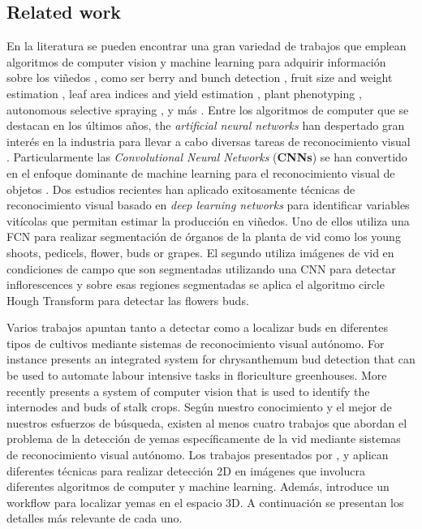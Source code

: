 \documentclass[a4paper,authoryear,review]{elsarticle}
\begin{document}
\subsection{Related work}   \label{sec:related}

En la literatura se pueden encontrar una gran variedad de trabajos que emplean algoritmos de computer vision y machine learning para adquirir información sobre los viñedos \citep{seng2018computer}, como ser berry and bunch detection \citep{nuske2011yield}, fruit size and weight estimation \citep{tardaguila2012automatic}, leaf area indices and yield estimation \citep{diago2012grapevine}, plant phenotyping \citep{herzog2014objective, herzog2014initial}, autonomous selective spraying \citep{berenstein2010grape}, y más \citep{tardaguila2012applications, whalley2013applications}. Entre los algoritmos de computer que se destacan en los últimos años, the \emph{artificial neural networks} han despertado gran interés en la industria para llevar a cabo diversas tareas de reconocimiento visual \citep{hirano2006industry, kahng2017cti, tilgner2019multi}. Particularmente las \emph{Convolutional Neural Networks} (\textbf{CNNs}) se han convertido en el enfoque dominante de machine learning para el reconocimiento visual de objetos \citep{ning2017inception}. Dos estudios recientes han aplicado exitosamente técnicas de reconocimiento visual basado en \emph{deep learning networks} para identificar variables vitícolas que permitan estimar la producción en viñedos. Uno de ellos \citet{grimm2019adaptable} utiliza una FCN para realizar segmentación de órganos de la planta de vid como los young shoots, pedicels, flower, buds or grapes. El segundo \citet{rudolph2018efficient} utiliza imágenes de vid en condiciones de campo que son segmentadas utilizando una CNN para detectar inflorescences y sobre esas regiones segmentadas se aplica el algoritmo circle Hough Transform para detectar las flowers buds.

Varios trabajos apuntan tanto a detectar como a localizar buds en diferentes tipos de cultivos mediante sistemas de reconocimiento visual autónomo. For instance \citet{tarry2014integrated} presents an integrated system for chrysanthemum bud detection that can be used to automate labour intensive tasks in floriculture greenhouses. More recently \citet{zhao2018research} presents a system  of  computer  vision  that is used  to  identify  the  internodes and  buds  of  stalk  crops. Según nuestro conocimiento y el mejor de nuestros esfuerzos de búsqueda, existen al menos cuatro trabajos que abordan el problema de la detección de yemas específicamente de la vid mediante sistemas de reconocimiento visual autónomo. Los trabajos presentados por \citet{xu2014detection}, \citet{herzog2014initial} y \citet{perez2017image} aplican diferentes técnicas para realizar detección 2D en imágenes que involucra diferentes algoritmos de computer y machine learning. Además, \citet{diaz2018grapevine} introduce un workflow para localizar yemas en el espacio 3D. A continuación se presentan los detalles más relevante de cada uno.
\end{document}
